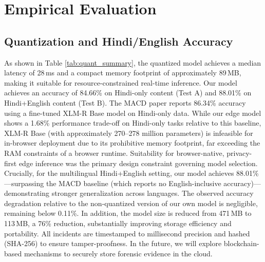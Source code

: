 \documentclass[sigconf,9pt]{acmart}
\begin{document}
\section{Empirical Evaluation}

\subsection{Quantization and Hindi/English Accuracy}
As shown in Table \ref{tab:quant_summary}, the quantized model achieves a median latency of 28\,ms and a compact memory footprint of approximately 89\,MB, making it suitable for resource-constrained real-time inference. Our model achieves an accuracy of 84.66\% on Hindi-only content (Test A) and 88.01\% on Hindi+English content (Test B). The MACD paper reports 86.34\% accuracy using a fine-tuned XLM-R Base model on Hindi-only data. While our edge model shows a 1.68\% performance trade-off on Hindi-only tasks relative to this baseline, XLM-R Base (with approximately 270--278 million parameters) is infeasible for in-browser deployment due to its prohibitive memory footprint, far exceeding the RAM constraints of a browser runtime. Suitability for browser-native, privacy-first edge inference was the primary design constraint governing model selection. Crucially, for the multilingual Hindi+English setting, our model achieves 88.01\%---surpassing the MACD baseline (which reports no English-inclusive accuracy)---demonstrating stronger generalization across languages. The observed accuracy degradation relative to the non-quantized version of our own model is negligible, remaining below 0.11\%. In addition, the model size is reduced from 471\,MB to 113\,MB, a 76\% reduction, substantially improving storage efficiency and portability. All incidents are timestamped to millisecond precision and hashed (SHA-256) to ensure tamper-proofness. In the future, we will explore blockchain-based mechanisms to securely store forensic evidence in the cloud.

\begin{table}[h!]
\centering
\caption{Post-Quantization Performance Summary}
\label{tab:quant_summary}
\end{table}
\end{document}

